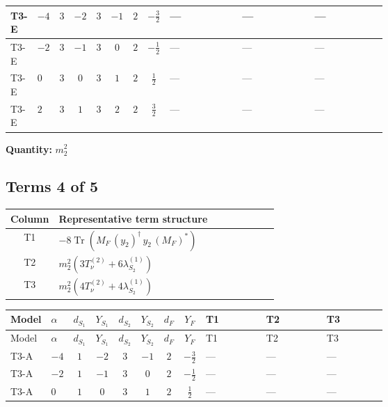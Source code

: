 \documentclass[8pt]{article}
\begin{document}
\begin{landscape}
\begin{longtable}{@{}llcccccc >{\raggedright\arraybackslash}p{0.21\linewidth} >{\raggedright\arraybackslash}p{0.21\linewidth} >{\raggedright\arraybackslash}p{0.21\linewidth}@{}}
\midrule
T3-E & $-4$ & $3$ & $-2$ & $3$ & $-1$ & $2$ & $-\frac{3}{2}$ & --- & --- & --- \\
\midrule
T3-E & $-2$ & $3$ & $-1$ & $3$ & $0$ & $2$ & $-\frac{1}{2}$ & --- & --- & --- \\
\midrule
T3-E & $0$ & $3$ & $0$ & $3$ & $1$ & $2$ & $\frac{1}{2}$ & --- & --- & --- \\
\midrule
T3-E & $2$ & $3$ & $1$ & $3$ & $2$ & $2$ & $\frac{3}{2}$ & --- & --- & --- \\
\midrule
\bottomrule
\end{longtable}
\clearpage
\noindent\textbf{Quantity: }$m_2^2$\par\smallskip
\subsection*{Terms 4 of 5}
\begin{center}
\begin{tabular}{@{}c >{\raggedright\arraybackslash}p{0.82\linewidth}@{}}
\toprule
Column & Representative term structure \\
\midrule
T1 & \(\displaystyle -8 \operatorname{Tr}\!\left({M_F}\,\left({y_2}\right)^{\dagger}\,{y_2}\,\left({M_F}\right)^{*}\right)\) \\
\midrule
T2 & \(\displaystyle {m_2^2} (3 T_{\nu}^{(2)}+6 {\lambda_{S_2}^{(1)}})\) \\
\midrule
T3 & \(\displaystyle {m_2^2} (4 T_{\nu}^{(2)}+4 {\lambda_{S_2}^{(1)}})\) \\
\midrule
\bottomrule
\end{tabular}
\end{center}
\smallskip
\tiny
\begin{longtable}{@{}llcccccc >{\raggedright\arraybackslash}p{0.21\linewidth} >{\raggedright\arraybackslash}p{0.21\linewidth} >{\raggedright\arraybackslash}p{0.21\linewidth}@{}}
\toprule
Model & $\alpha$ & $d_{S_1}$ & $Y_{S_1}$ & $d_{S_2}$ & $Y_{S_2}$ & $d_F$ & $Y_F$ & T1 & T2 & T3 \\
\midrule
\endfirsthead
\toprule
Model & $\alpha$ & $d_{S_1}$ & $Y_{S_1}$ & $d_{S_2}$ & $Y_{S_2}$ & $d_F$ & $Y_F$ & T1 & T2 & T3 \\
\midrule
\endhead
T3-A & $-4$ & $1$ & $-2$ & $3$ & $-1$ & $2$ & $-\frac{3}{2}$ & --- & --- & --- \\
\midrule
T3-A & $-2$ & $1$ & $-1$ & $3$ & $0$ & $2$ & $-\frac{1}{2}$ & --- & --- & --- \\
\midrule
T3-A & $0$ & $1$ & $0$ & $3$ & $1$ & $2$ & $\frac{1}{2}$ & --- & --- & --- \\

\end{longtable}
\end{landscape}
\end{document}
